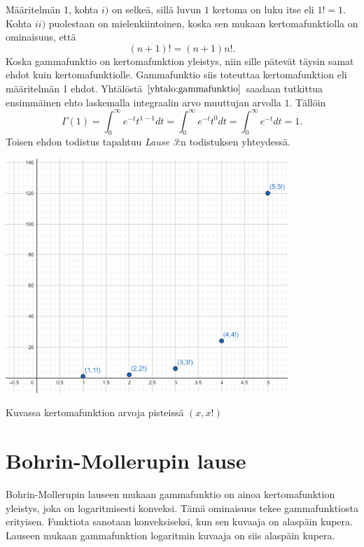 \documentclass[12pt]{article}
\theoremstyle{definition}
\theoremstyle{plain}
\numberwithin{equation}{section}
\begin{document}
Määritelmän 1, kohta $i)$ on selkeä, sillä luvun $1$ kertoma on luku itse eli $1!=1$. Kohta $ii)$ puolestaan on mielenkiintoinen, koska sen mukaan kertomafunktiolla on ominaisuus, että 
\begin{equation}
    (n+1)! = (n+1)n!.
\end{equation}
Koska gammafunktio on kertomafunktion yleistys, niin sille pätevät täysin samat ehdot kuin kertomafunktiolle. Gammafunktio siis toteuttaa kertomafunktion eli määritelmän 1 ehdot. Yhtälöstä $\eqref{yhtalo:gammafunktio}$ saadaan tutkittua ensimmäinen ehto laskemalla integraalin arvo muuttujan arvolla $1$. Tällöin
\begin{equation*}
    \Gamma(1)=\int_0^\infty e^{-t}t^{1-1}dt=\int_0^\infty e^{-t}t^{0}dt = \int_0^\infty e^{-t}dt = 1.
\end{equation*}
Toisen ehdon todistus tapahtuu \emph{Lause 3}:n todistuksen yhteydessä.
\begin{center}
\includegraphics[width=0.8\textwidth]{kertomakuva.png} \newline
\caption{Kuvassa kertomafunktion arvoja pisteissä $(x,x!)$}
\end{center}

\newpage

\section{Bohrin-Mollerupin lause}
\onehalfspacing
Bohrin-Mollerupin lauseen mukaan gammafunktio on ainoa kertomafunktion yleistys, joka on logaritmisesti konveksi. Tämä ominaisuus tekee gammafunktiosta erityisen. Funktiota sanotaan konveksiseksi, kun sen kuvaaja on alaspäin kupera. Lauseen mukaan gammafunktion logaritmin kuvaaja on siis alaspäin kupera.
\newline
\end{document}
